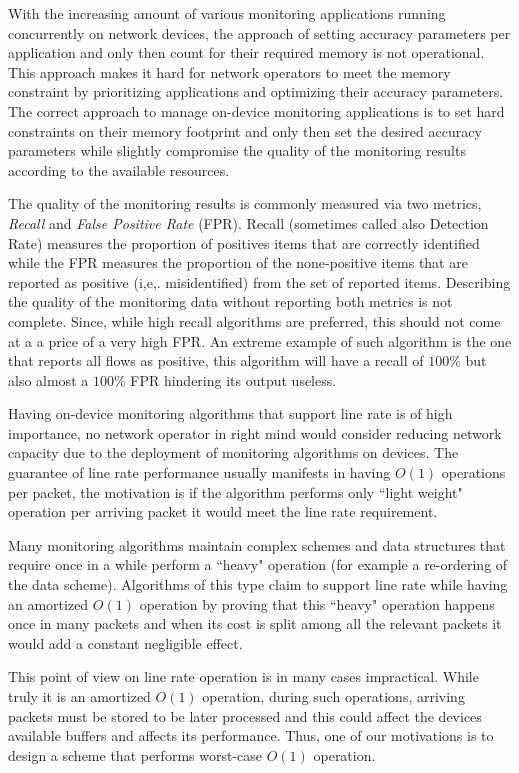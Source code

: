With the increasing amount of various monitoring applications running concurrently on network devices, the approach of setting accuracy parameters per application and only then count for their required memory is not operational. This approach makes it hard for network operators to meet the memory constraint by prioritizing applications and optimizing their accuracy parameters. The correct approach to manage on-device monitoring applications is to set hard constraints on their memory footprint and only then set the desired accuracy parameters while slightly compromise the quality of the monitoring results according to the available resources. 

The quality of the monitoring results is commonly measured via two metrics, \textit{Recall} and \textit{False Positive Rate} (FPR). Recall (sometimes called also Detection Rate) measures the proportion of positives items that are correctly identified while the FPR measures the proportion of the none-positive items that are reported as positive (i,e,. misidentified) from the set of reported items.  Describing the quality of the monitoring data without reporting both metrics is not complete. Since, while high recall algorithms are preferred, this should not come at a a price of a very high FPR. An extreme example of such algorithm is the one that reports all flows as positive, this algorithm will have a recall of $100\%$ but also almost a $100\%$ FPR hindering its output useless.

Having on-device monitoring algorithms that support line rate is of high importance, no network operator in right mind would consider reducing network capacity due to the deployment of monitoring algorithms on devices. The guarantee of line rate performance usually manifests in having $O(1)$ operations per packet, the motivation is if the algorithm performs only ``light weight" operation per arriving packet it would meet the line rate requirement.

Many monitoring algorithms maintain complex schemes and data structures that require once in a while perform a ``heavy" operation (for example a re-ordering of the data scheme). Algorithms of this type claim to support line rate while having an amortized $O(1)$ operation by proving that this ``heavy" operation happens once in many packets and when its cost is split among all the relevant packets it would add a constant negligible effect.

This point of view on line rate operation is in many cases impractical. While truly it is an amortized $O(1)$ operation, during such operations, arriving packets must be stored to be later processed and this could affect the devices available buffers and affects its performance. Thus, one of our motivations is to design a scheme that performs worst-case $O(1)$ operation.

